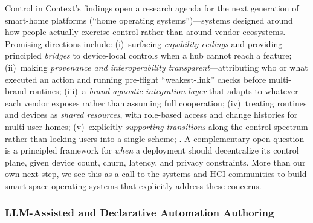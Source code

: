 Control in Context's findings open a research agenda for the next generation of smart-home platforms (``home operating systems'')---systems designed around how people actually exercise control rather than around vendor ecosystems. Promising directions include: (i)~surfacing \emph{capability ceilings} and providing principled \emph{bridges} to device-local controls when a hub cannot reach a feature; (ii)~making \emph{provenance and interoperability transparent}---attributing who or what executed an action and running pre-flight ``weakest-link'' checks before multi-brand routines; (iii)~a \emph{brand-agnostic integration layer} that adapts to whatever each vendor exposes rather than assuming full cooperation; (iv)~treating routines and devices as \emph{shared resources}, with role-based access and change histories for multi-user homes; (v)~explicitly \emph{supporting transitions} along the control spectrum rather than locking users into a single scheme;  . A complementary open question is a principled framework for \emph{when} a deployment should decentralize its control plane, given device count, churn, latency, and privacy constraints. More than our own next step, we see this as a call to the systems and HCI communities to build smart-space operating systems that explicitly address these concerns.


\subsubsection{LLM-Assisted and Declarative Automation Authoring}
\label{conc:sec:llm-automation}

